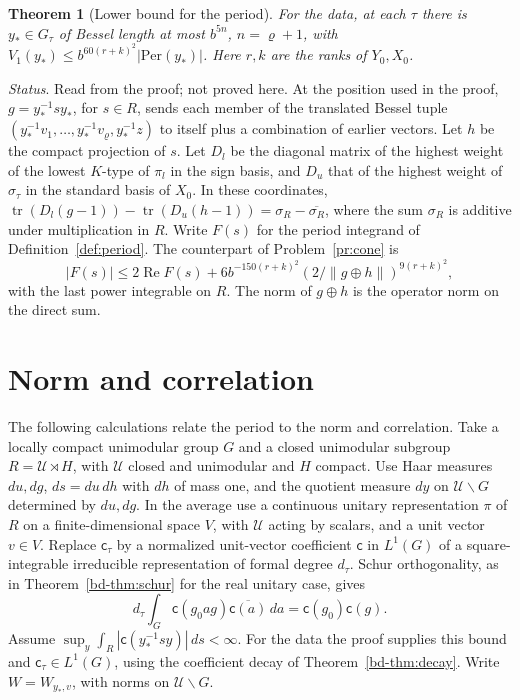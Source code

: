\documentclass[reqno]{amsart}
\theoremstyle{definition}
\theoremstyle{plain}
\newtheorem{theorem}{Theorem}[section]
\theoremstyle{remark}
\newcommand{\Uc}{\mathcal U}
\newcommand{\cf}{\mathsf c}
\newcommand{\Per}{\mathrm{Per}}
\newcommand{\tr}{\operatorname{tr}}
\begin{document}
\begin{theorem}[Lower bound for the period]\label{thm:period}
For the data, at each \(\tau\) there is \(y_*\in G_\tau\) of Bessel length at most \(b^{5n}\), \(n=\varrho+1\), with \(V_1(y_*)\le b^{60(r+k)^2}|\Per(y_*)|\).  Here \(r,k\) are the ranks of \(Y_0,X_0\).
\end{theorem}

\noindent\emph{Status}.  Read from the proof; not proved here.  At the position used in the proof, \(g=y_*^{-1}sy_*\), for \(s\in R\), sends each member of the translated Bessel tuple \((y_*^{-1}v_1,\dots,y_*^{-1}v_\varrho,y_*^{-1}z)\) to itself plus a combination of earlier vectors.  Let \(h\) be the compact projection of \(s\).  Let \(D_l\) be the diagonal matrix of the highest weight of the lowest \(K\)-type of \(\pi_l\) in the sign basis, and \(D_u\) that of the highest weight of \(\sigma_\tau\) in the standard basis of \(X_0\).  In these coordinates,
\(\tr(D_l(g-1))-\tr(D_u(h-1))=\sigma_R-\overline{\sigma_R}\), where the sum \(\sigma_R\) is additive under multiplication in \(R\).  Write \(F(s)\) for the period integrand of Definition~\ref{def:period}.  The counterpart of Problem~\ref{pr:cone} is
\[
 |F(s)|\le2\operatorname{Re}F(s)+
  6b^{-150(r+k)^2}(2/\|g\oplus h\|)^{9(r+k)^2},
\]
with the last power integrable on \(R\).  The norm of \(g\oplus h\) is the operator norm on the direct sum.

\section{Norm and correlation}\label{sec:norm}

The following calculations relate the period to the norm and correlation.  Take a locally compact unimodular group \(G\) and a closed unimodular subgroup \(R=\Uc\rtimes H\), with \(\Uc\) closed and unimodular and \(H\) compact.  Use Haar measures \(du,dg\), \(ds=du\,dh\) with \(dh\) of mass one, and the quotient measure \(dy\) on \(\Uc\backslash G\) determined by \(du,dg\).  In the average use a continuous unitary representation \(\pi\) of \(R\) on a finite-dimensional space \(V\), with \(\Uc\) acting by scalars, and a unit vector \(v\in V\).  Replace \(\cf_\tau\) by a normalized unit-vector coefficient \(\cf\) in \(L^1(G)\) of a square-integrable irreducible representation of formal degree \(d_\tau\).  Schur orthogonality, as in Theorem~\ref{bd-thm:schur} for the real unitary case, gives
\[
 d_\tau\int_G \cf(g_0 a g)\overline{\cf(a)}\,da=\cf(g_0)\cf(g).
\]
Assume \(\sup_y\int_R|\cf(y_*^{-1}sy)|\,ds<\infty\).  For the data the proof supplies this bound and \(\cf_\tau\in L^1(G)\), using the coefficient decay of Theorem~\ref{bd-thm:decay}.  Write \(W=W_{y_*,v}\), with norms on \(\Uc\backslash G\).
\end{document}
